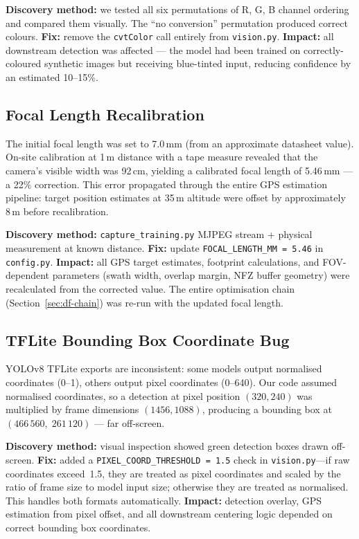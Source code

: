 \documentclass[10pt,a4paper]{article}
\begin{document}
\textbf{Discovery method:} we tested all six permutations of R, G, B channel ordering and compared them visually. The ``no conversion'' permutation produced correct colours. \textbf{Fix:} remove the \texttt{cvtColor} call entirely from \texttt{vision.py}. \textbf{Impact:} all downstream detection was affected --- the model had been trained on correctly-coloured synthetic images but receiving blue-tinted input, reducing confidence by an estimated 10--15\%.

\subsection{Focal Length Recalibration}

The initial focal length was set to 7.0\,mm (from an approximate datasheet value). On-site calibration at 1\,m distance with a tape measure revealed that the camera's visible width was 92\,cm, yielding a calibrated focal length of 5.46\,mm --- a 22\% correction. This error propagated through the entire GPS estimation pipeline: target position estimates at 35\,m altitude were offset by approximately 8\,m before recalibration.

\textbf{Discovery method:} \texttt{capture\_training.py} MJPEG stream + physical measurement at known distance. \textbf{Fix:} update \texttt{FOCAL\_LENGTH\_MM = 5.46} in \texttt{config.py}. \textbf{Impact:} all GPS target estimates, footprint calculations, and FOV-dependent parameters (swath width, overlap margin, NFZ buffer geometry) were recalculated from the corrected value. The entire optimisation chain (Section~\ref{sec:df-chain}) was re-run with the updated focal length.

\subsection{TFLite Bounding Box Coordinate Bug}

YOLOv8 TFLite exports are inconsistent: some models output normalised coordinates (0--1), others output pixel coordinates (0--640). Our code assumed normalised coordinates, so a detection at pixel position $(320, 240)$ was multiplied by frame dimensions $(1456, 1088)$, producing a bounding box at $(466\,560,\; 261\,120)$ --- far off-screen.

{\sloppy\textbf{Discovery method:} visual inspection showed green detection boxes drawn off-screen. \textbf{Fix:} added a \texttt{PIXEL\_COORD\_THRESHOLD\,=\,1.5} check in \texttt{vision.py}---if raw coordinates exceed~1.5, they are treated as pixel coordinates and scaled by the ratio of frame size to model input size; otherwise they are treated as normalised. This handles both formats automatically. \textbf{Impact:} detection overlay, GPS estimation from pixel offset, and all downstream centering logic depended on correct bounding box coordinates.\par}
\end{document}
